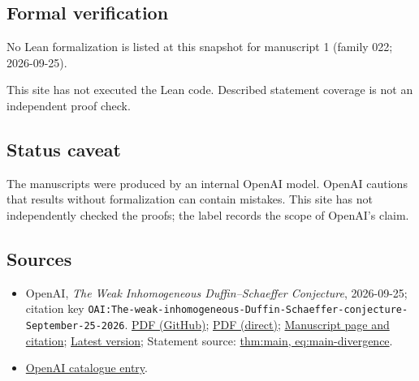 \documentclass[11pt]{article}
\begin{document}
\subsection{Formal verification}
No Lean formalization is listed at this snapshot for manuscript 1 (family 022; 2026-09-25).

This site has not executed the Lean code. Described statement coverage is not an independent proof check.

\subsection{Status caveat}
The manuscripts were produced by an internal OpenAI model. OpenAI cautions that results without formalization can contain mistakes. This site has not independently checked the proofs; the label records the scope of OpenAI's claim.

\subsection{Sources}
\begin{itemize}
\item OpenAI, \emph{The Weak Inhomogeneous Duffin–Schaeffer Conjecture}, 2026-09-25; citation key \texttt{OAI:The-weak-inhomogeneous-Duffin-Schaeffer-conjecture-September-25-2026}. \href{https://github.com/openai/math/blob/adc7f1241b42e322a6451854ab7e4b4c146bf78a/preprints/The-weak-inhomogeneous-Duffin-Schaeffer-conjecture-September-25-2026/paper.pdf}{PDF (GitHub)}; \href{https://github.com/openai/math/raw/adc7f1241b42e322a6451854ab7e4b4c146bf78a/preprints/The-weak-inhomogeneous-Duffin-Schaeffer-conjecture-September-25-2026/paper.pdf}{PDF (direct)}; \href{https://github.com/openai/math/blob/adc7f1241b42e322a6451854ab7e4b4c146bf78a/preprints/The-weak-inhomogeneous-Duffin-Schaeffer-conjecture-September-25-2026/README.md}{Manuscript page and citation}; \href{https://github.com/openai/math/blob/main/preprints/The-weak-inhomogeneous-Duffin-Schaeffer-conjecture-September-25-2026/paper.pdf}{Latest version}; Statement source: \href{https://github.com/openai/math/blob/adc7f1241b42e322a6451854ab7e4b4c146bf78a/preprints/The-weak-inhomogeneous-Duffin-Schaeffer-conjecture-September-25-2026/build/sections/introduction.tex\#L9}{thm:main, eq:main-divergence}.
\item \href{https://github.com/openai/math/blob/adc7f1241b42e322a6451854ab7e4b4c146bf78a/CONTENTS.md}{OpenAI catalogue entry}.
\end{itemize}
\end{document}
